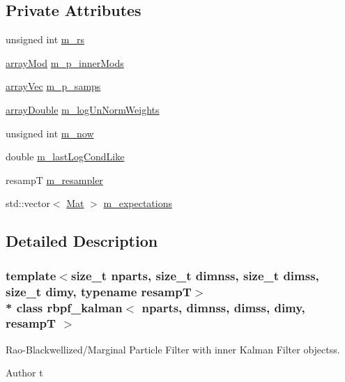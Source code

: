 \subsection*{Private Attributes}
\begin{DoxyCompactItemize}
\item 
unsigned int \hyperlink{classrbpf__kalman_af17d1220365ce1e7c12e47d8410c7121}{m\+\_\+rs}
\item 
\hyperlink{classrbpf__kalman_aaf46b726f40b4aaa3be3f225790f76f6}{array\+Mod} \hyperlink{classrbpf__kalman_a1aa8b0b72b574a913c6474f4eca6047e}{m\+\_\+p\+\_\+inner\+Mods}
\item 
\hyperlink{classrbpf__kalman_a214378a5c76ff8bfc91cf77bfa523d02}{array\+Vec} \hyperlink{classrbpf__kalman_a0987b2423385e96309914032a976897a}{m\+\_\+p\+\_\+samps}
\item 
\hyperlink{classrbpf__kalman_a1911a9cc687ba6fe9890e5f448d1626a}{array\+Double} \hyperlink{classrbpf__kalman_a69bf4f905a84e8b003e732763a06a264}{m\+\_\+log\+Un\+Norm\+Weights}
\item 
unsigned int \hyperlink{classrbpf__kalman_aa463a5411c640a8cd3b4c48a691bf9c1}{m\+\_\+now}
\item 
double \hyperlink{classrbpf__kalman_a6e0e835d26a8df872090e95f0168caa6}{m\+\_\+last\+Log\+Cond\+Like}
\item 
resampT \hyperlink{classrbpf__kalman_a5fdc4be3bc5018f52708d57c90e4c921}{m\+\_\+resampler}
\item 
std\+::vector$<$ \hyperlink{classrbpf__kalman_a042212551b46f72a5d3d58f7073d19ee}{Mat} $>$ \hyperlink{classrbpf__kalman_a7b7f24deb8e7f1a8a5e714a461d115d3}{m\+\_\+expectations}
\end{DoxyCompactItemize}


\subsection{Detailed Description}
\subsubsection*{template$<$size\+\_\+t nparts, size\+\_\+t dimnss, size\+\_\+t dimss, size\+\_\+t dimy, typename resampT$>$\\*
class rbpf\+\_\+kalman$<$ nparts, dimnss, dimss, dimy, resamp\+T $>$}

Rao-\/\+Blackwellized/\+Marginal Particle Filter with inner Kalman Filter objectss. 

\begin{DoxyAuthor}{Author}
t 
\end{DoxyAuthor}


